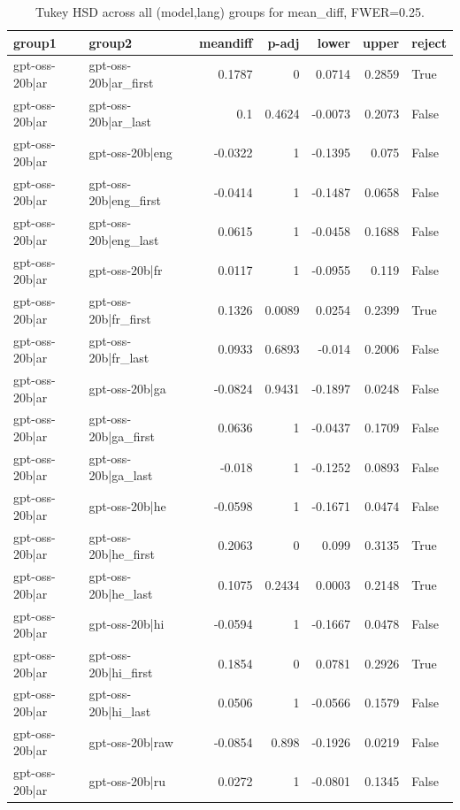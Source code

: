 \begin{table}
\caption{Tukey HSD across all (model,lang) groups for mean_diff, FWER=0.25.}
\label{tab:tukey_all_models_all_langs_mean_diff}
\begin{tabular}{l l r r r r l}
\toprule
group1 & group2 & meandiff & p-adj & lower & upper & reject \\
\midrule
gpt-oss-20b|ar & gpt-oss-20b|ar_first & 0.1787 & 0 & 0.0714 & 0.2859 & True \\
gpt-oss-20b|ar & gpt-oss-20b|ar_last & 0.1 & 0.4624 & -0.0073 & 0.2073 & False \\
gpt-oss-20b|ar & gpt-oss-20b|eng & -0.0322 & 1 & -0.1395 & 0.075 & False \\
gpt-oss-20b|ar & gpt-oss-20b|eng_first & -0.0414 & 1 & -0.1487 & 0.0658 & False \\
gpt-oss-20b|ar & gpt-oss-20b|eng_last & 0.0615 & 1 & -0.0458 & 0.1688 & False \\
gpt-oss-20b|ar & gpt-oss-20b|fr & 0.0117 & 1 & -0.0955 & 0.119 & False \\
gpt-oss-20b|ar & gpt-oss-20b|fr_first & 0.1326 & 0.0089 & 0.0254 & 0.2399 & True \\
gpt-oss-20b|ar & gpt-oss-20b|fr_last & 0.0933 & 0.6893 & -0.014 & 0.2006 & False \\
gpt-oss-20b|ar & gpt-oss-20b|ga & -0.0824 & 0.9431 & -0.1897 & 0.0248 & False \\
gpt-oss-20b|ar & gpt-oss-20b|ga_first & 0.0636 & 1 & -0.0437 & 0.1709 & False \\
gpt-oss-20b|ar & gpt-oss-20b|ga_last & -0.018 & 1 & -0.1252 & 0.0893 & False \\
gpt-oss-20b|ar & gpt-oss-20b|he & -0.0598 & 1 & -0.1671 & 0.0474 & False \\
gpt-oss-20b|ar & gpt-oss-20b|he_first & 0.2063 & 0 & 0.099 & 0.3135 & True \\
gpt-oss-20b|ar & gpt-oss-20b|he_last & 0.1075 & 0.2434 & 0.0003 & 0.2148 & True \\
gpt-oss-20b|ar & gpt-oss-20b|hi & -0.0594 & 1 & -0.1667 & 0.0478 & False \\
gpt-oss-20b|ar & gpt-oss-20b|hi_first & 0.1854 & 0 & 0.0781 & 0.2926 & True \\
gpt-oss-20b|ar & gpt-oss-20b|hi_last & 0.0506 & 1 & -0.0566 & 0.1579 & False \\
gpt-oss-20b|ar & gpt-oss-20b|raw & -0.0854 & 0.898 & -0.1926 & 0.0219 & False \\
gpt-oss-20b|ar & gpt-oss-20b|ru & 0.0272 & 1 & -0.0801 & 0.1345 & False \\

\end{tabular}
\end{table}
